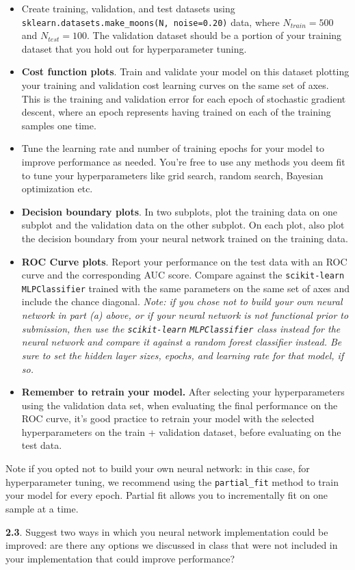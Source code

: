 \documentclass[
  letterpaper,
  DIV=11,
  numbers=noendperiod]{scrartcl}
\providecommand{\tightlist}{%
  \setlength{\itemsep}{0pt}\setlength{\parskip}{0pt}}\usepackage{longtable,booktabs,array}
\begin{document}
\begin{itemize}
\tightlist
\item
  Create training, validation, and test datasets using
  \texttt{sklearn.datasets.make\_moons(N,\ noise=0.20)} data, where
  \(N_{train} = 500\) and \(N_{test} = 100\). The validation dataset
  should be a portion of your training dataset that you hold out for
  hyperparameter tuning.
\item
  \textbf{Cost function plots}. Train and validate your model on this
  dataset plotting your training and validation cost learning curves on
  the same set of axes. This is the training and validation error for
  each epoch of stochastic gradient descent, where an epoch represents
  having trained on each of the training samples one time.
\item
  Tune the learning rate and number of training epochs for your model to
  improve performance as needed. You're free to use any methods you deem
  fit to tune your hyperparameters like grid search, random search,
  Bayesian optimization etc.
\item
  \textbf{Decision boundary plots}. In two subplots, plot the training
  data on one subplot and the validation data on the other subplot. On
  each plot, also plot the decision boundary from your neural network
  trained on the training data.
\item
  \textbf{ROC Curve plots}. Report your performance on the test data
  with an ROC curve and the corresponding AUC score. Compare against the
  \texttt{scikit-learn} \texttt{MLPClassifier} trained with the same
  parameters on the same set of axes and include the chance diagonal.
  \emph{Note: if you chose not to build your own neural network in part
  (a) above, or if your neural network is not functional prior to
  submission, then use the \texttt{scikit-learn} \texttt{MLPClassifier}
  class instead for the neural network and compare it against a random
  forest classifier instead. Be sure to set the hidden layer sizes,
  epochs, and learning rate for that model, if so.}
\item
  \textbf{Remember to retrain your model.} After selecting your
  hyperparameters using the validation data set, when evaluating the
  final performance on the ROC curve, it's good practice to retrain your
  model with the selected hyperparameters on the train + validation
  dataset, before evaluating on the test data.
\end{itemize}

Note if you opted not to build your own neural network: in this case,
for hyperparameter tuning, we recommend using the \texttt{partial\_fit}
method to train your model for every epoch. Partial fit allows you to
incrementally fit on one sample at a time.

\textbf{2.3}. Suggest two ways in which you neural network
implementation could be improved: are there any options we discussed in
class that were not included in your implementation that could improve
performance?
\end{document}
